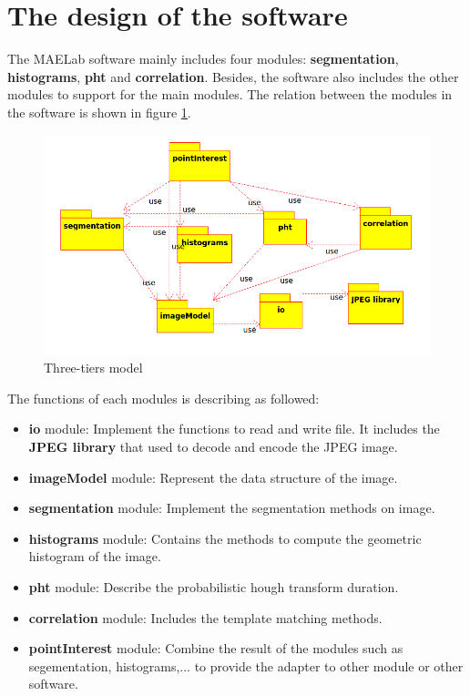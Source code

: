 \section{The design of the software}
The MAELab software mainly includes four modules: \textbf{segmentation}, \textbf{histograms}, \textbf{pht} and \textbf{correlation}. Besides, the software also includes the other modules to support for the main modules. The relation between the modules in the software is shown in figure \ref{fignsmodules}.
\begin{figure}[h]
	\centering
	\includegraphics[scale=0.5]{images/modules}
	\caption{Three-tiers model}
	\label{fignsmodules}
\end{figure}
The functions of each modules is describing as followed:
\begin{itemize}
	\item \textbf{io} module: Implement the functions to read and write file. It includes the \textbf{JPEG library} that used to decode and encode the JPEG image.
	\item \textbf{imageModel} module: Represent the data structure of the image.
	\item \textbf{segmentation} module: Implement the segmentation methods on image.
	\item \textbf{histograms} module: Contains the methods to compute the geometric histogram of the image.
	\item \textbf{pht} module: Describe the probabilistic hough transform duration.
	\item \textbf{correlation} module: Includes the template matching methods.
	\item \textbf{pointInterest} module: Combine the result of the modules such as segementation, histograms,... to provide the adapter to other module or other software.
\end{itemize}
